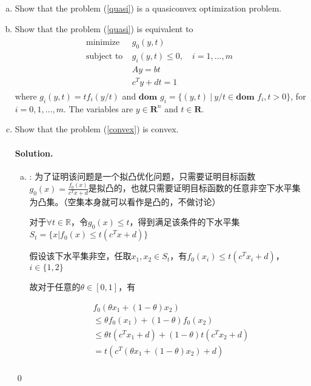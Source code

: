 \documentclass[a4paper]{article}
\newenvironment{solution}
{\color{blue} \paragraph{Solution.}}
{\newline \qed}
\begin{document}
\begin{enumerate}[a)]
    \item Show that the problem (\ref{quasi}) is a quasiconvex optimization problem.
    \item Show that the problem (\ref{quasi}) is equivalent to
    \begin{gather}
    \label{convex}
\begin{matrix}
\text{minimize~~} & g_0(y,t)\quad\quad\quad\quad\quad\quad\quad\quad~\\
\text{subject to} & g_i(y,t)\leq0,\quad i=1,\dots,m\\
&Ay=bt\quad\quad\quad\quad\quad\quad\quad\quad\\
&c^Ty+dt=1\quad\quad\quad\quad\quad~~
\end{matrix}
\end{gather}
where $g_i(y,t)=tf_i(y/t)$ and $\textbf{dom }g_i=\{(y,t)~|~y/t\in\textbf{dom }f_i,t>0\}$, for $i=0,1,\dots,m$. The variables are $y\in\mathbf{R}^n$ and $t\in\mathbf{R}$.
  \item Show that the problem (\ref{convex}) is convex.
\begin{solution}
    \begin{enumerate}[a)]
        \item : 为了证明该问题是一个拟凸优化问题，只需要证明目标函数$g_0(x)=\frac{f_0(x)}{c^Tx+d}$是拟凸的，也就只需要证明目标函数的任意非空下水平集为凸集。（空集本身就可以看作是凸的，不做讨论）
        
                对于$\forall t\in \mathbb{R}$，令$g_0(x)\leq t$，得到满足该条件的下水平集$S_t=\{x|f_0(x)\leq t(c^Tx+d)\}$

                假设该下水平集非空，任取$x_1, x_2\in S_t$，有$f_0(x_i)\leq t(c^Tx_i+d)$，$i\in\{1, 2\}$

                故对于任意的$\theta\in [0, 1]$，有

                \begin{equation}
                \begin{aligned}
                    &f_0(\theta x_1+(1-\theta)x_2)\\
                    &\leq \theta f_0(x_1)+(1-\theta)f_0(x_2)\\
                    &\leq\theta t(c^Tx_1+d)+(1-\theta)t(c^Tx_2+d)\\
                    &=t(c^T(\theta x_1+(1-\theta)x_2)+d)\\
                \end{aligned}
                \end{equation}


\end{enumerate}
\end{solution}
\end{enumerate}
\end{document}
